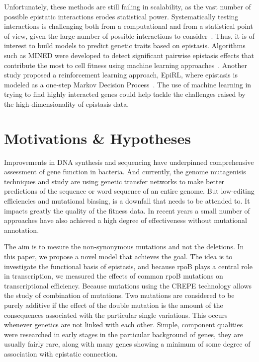 \documentclass[12pt]{article}
\begin{document}
  Unfortunately, these methods are still failing in scalability, as the vast
  number of possible epistatic interactions erodes statistical power.
  Systematically testing interactions is challenging both from a
  computational and from a statistical point of view, given the large number of
  possible interactions to consider~\cite{slim2019novel}. Thus, it is of
  interest to build models to predict genetic traits based on epistasis.
  Algorithms such as MINED were developed to detect significant pairwise
  epistasis effects that contribute the most to cell
  fitness using machine learning approaches~\cite{he2015mined}. Another study
  proposed a reinforcement learning approach, EpiRL, where epistasis is modeled
  as a one-step Markov Decision Process~\cite{huang2019epirl}. The use of
  machine learning in trying to find highly interacted genes could help tackle
  the challenges raised by the high-dimensionality of epistasis data.

  \section{Motivations \& Hypotheses}

  Improvements in DNA synthesis and sequencing have underpinned comprehensive
  assessment of gene function in bacteria. And currently, the genome
  mutagenisis techniques and study are using genetic transfer networks to make
  better predictions of the sequence or word sequence of an entire genome. But
  low-editing efficiencies and mutational biasing, is a downfall that needs to
  be attended to. It impacts greatly the quality of the fitness data.  In
  recent years a small number of approaches have also achieved a high degree of
  effectiveness without mutational annotation. 

  The aim is to mesure the non-synonymous mutations and not the deletions.  In
  this paper, we propose a novel model that achieves the goal.  The idea is to
  investigate the functional basis of epistasis, and because rpoB plays a
  central role in transcription, we measured the effects of common rpoB
  mutations on transcriptional efficiency. Because mutations using the CREPE
  technology allows the study of combination of mutations. Two mutations are
  considered to be purely additive if the effect of the double mutation is the
  amount of the consequences associated with the particular single variations.
  This occurs whenever genetics are not linked with each other. Simple,
  component qualities were researched in early stages in the particular
  background of genes, they are usually fairly rare, along with many genes
  showing a minimum of some degree of association with epistatic connection.
\end{document}
